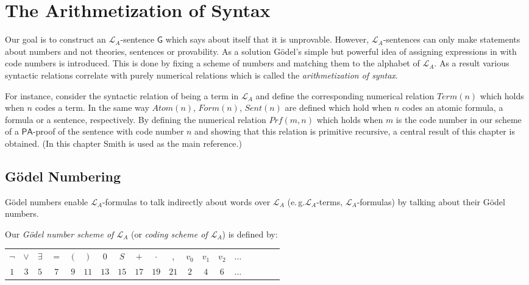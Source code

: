 \chapter{The Arithmetization of Syntax}

Our goal is to construct an $\mathcal{L}_A$-sentence $\mathsf{G}$ which says about itself that it is unprovable. However, $\mathcal{L}_A$-sentences can only make statements about numbers and not theories, sentences or provability. As a solution Gödel's simple but powerful idea of assigning expressions in \PA with code numbers is introduced. This is done by fixing a scheme of numbers and matching them to the alphabet of $\mathcal{L}_A$. As a result various syntactic relations correlate with purely numerical relations which is called the \textit{arithmetization of syntax}. 
  
For instance, consider the syntactic relation of being a term in $\mathcal{L}_A$ and define the corresponding numerical relation $\mathit{Term}(n)$ which holds when $n$ codes a term. In the same way $\mathit{Atom}(n)$, $\mathit{Form}(n)$, $\mathit{Sent}(n)$ are defined which hold when $n$ codes an atomic formula, a formula or a sentence, respectively. By defining the numerical relation $\mathit{Prf}(m,n)$ which holds when $m$ is the code number in our scheme of a $\mathsf{PA}$-proof of the sentence with code number $n$ and showing that this relation is primitive recursive, a central result of this chapter is obtained. (In this chapter Smith \cite{Smith2009} is used as the main reference.)

\section{G\"odel Numbering}

Gödel numbers enable $\mathcal{L}_A$-formulas to talk indirectly about words over $\mathcal{L}_A$ (e.\,g.\@ $\mathcal{L}_A$-terms, $\mathcal{L}_A$-formulas) by talking about their G\"odel numbers.  

\begin{dfn}
Our \textit{G\"odel number scheme of $\mathcal{L}_A$} (or \textit{coding scheme of $\mathcal{L}_A$}) is defined by:
\begin{center}
\begin{tabular}{ c c c c c c c c c c c c c c c c c c c }
$\lnot$ &  $\vee$ & $\exists$ & $=$ & $($ & $)$ & $0$ & $S$ & $+$ & $\cdot$ & , & $v_0$ & $v_1$ & $v_2$ & $\ldots$ \\ 
$1$ & $3$ & $5$ & $7$ & $9$ & $11$ & $13$ & $15$ & $17$ & $19$ & $21$ & $2$ & $4$ & $6$ & $\ldots$ 
\end{tabular}
\end{center}
\end{dfn}

